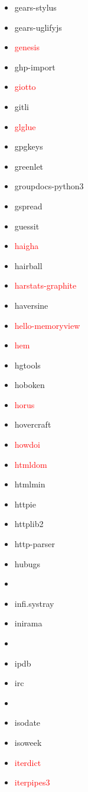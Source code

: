 \documentclass{l4proj}
\begin{document}
\begin{appendices}
{\begin{itemize}
\item gears-stylus
\item gears-uglifyjs
\item\textcolor{red}{genesis}
\item ghp-import
\item\textcolor{red}{giotto}
\item gitli
\item\textcolor{red}{glglue}
\item gpgkeys
\item greenlet
\item groupdocs-python3
\item gspread
\item guessit
\item\textcolor{red}{haigha}
\item hairball
\item\textcolor{red}{harstats-graphite}
\end{itemize}
}%
\noindent\parbox[t]{0.32\textwidth}{\raggedright%
\begin{itemize}
\item haversine
\item\textcolor{red}{hello-memoryview}
\item\textcolor{red}{hem}
\item hgtools
\item hoboken
\item\textcolor{red}{horus}
\item hovercraft
\item\textcolor{red}{howdoi}
\item\textcolor{red}{htmldom}
\item htmlmin
\item httpie
\item httplib2
\item http-parser
\item hubugs
\item\textcolor{red}{}
\item infi.systray
\item inirama
\item {}
\item ipdb
\item irc
\item\textcolor{red}{}
\item isodate
\item isoweek
\item\textcolor{red}{iterdict}
\item\textcolor{red}{iterpipes3}

\end{itemize}}
\end{appendices}
\end{document}
